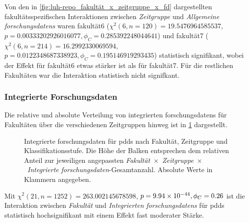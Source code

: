 Von den in \cref{fig:luh-repo_fakultät_x_zeitgruppe_x_fd} dargestellten fakultätsspezifischen Interaktionen zwischen \textit{Zeitgruppe} und \textit{Allgemeine \glspl{forschungsdaten}} waren \gls{fakultät6} ($\chi^2 (\num{6}, n=\num{120}) = \num[round-mode=places,round-precision=2]{19.5476964585537}$, $p = \num[round-mode=places,round-precision=2]{0.00333202926016077},\phi_C=\num[round-mode=places,round-precision=2]{0.285392248044641}$) und \gls{fakultät7} ($\chi^2 (\num{6}, n=\num{214}) = \num[round-mode=places,round-precision=2]{16.2992330069594}$, $p = \num[round-mode=places,round-precision=2]{0.0122348687338923},\phi_C=\num[round-mode=places,round-precision=2]{0.195146919293435}$) statistisch signifikant, wobei der Effekt für \gls{fakultät6} etwas stärker ist als für \gls{fakultät7}.
Für die restlichen Fakultäten war die Interaktion statistisch nicht signifkant.

\subsubsection{Integrierte Forschungsdaten}
Die relative und absolute Verteilung von integrierten \glspl{forschungsdaten} für Fakultäten über die verschiedenen Zeitgruppen hinweg ist in \cref{fig:luh-repo_fakultät_x_zeitgruppe_x_intern-fd} dargestellt.
\begin{figure}[!htbp]
    \resizebox{\ifdim\width>\textwidth\textwidth\else\width\fi}{!}{}
    \caption{Integrierte \gls{forschungsdaten} für \glspl{pdd} nach Fakultät, Zeitgruppe und Klassifikationsstufe.
    Die Höhe der Balken entsprechen dem relativen Anteil zur jeweiligen angepassten \textit{Fakultät}~$\times$~\textit{Zeitgruppe}~$\times$~\textit{Integrierte \gls{forschungsdaten}}-Gesamtanzahl.
    Absolute Werte in Klammern angegeben.}
    \label{fig:luh-repo_fakultät_x_zeitgruppe_x_intern-fd}
\end{figure}
Mit $\chi^2 (\num{21}, n=\num{1252}) = \num[round-mode=places,round-precision=2]{263.002145678598}$, $p = \num[round-mode=places,round-precision=2]{9.94476930299567E-44},\phi_C=\num[round-mode=places,round-precision=2]{0.264616459279196}$ ist die Interaktion zwischen \textit{Fakultät} und \textit{Integrierten \glspl{forschungsdaten}} für \glspl{pdd} statistisch hochsignifikant mit einem Effekt fast moderater Stärke.


